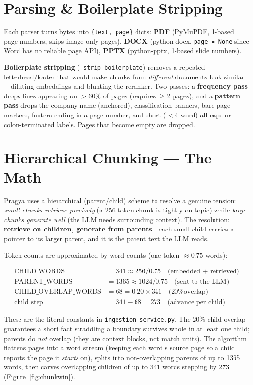 \documentclass[11pt,a4paper,oneside]{report}
\newcommand{\code}[1]{\texttt{#1}}
\begin{document}
\section{Parsing \& Boilerplate Stripping}
Each parser turns bytes into \code{\{text, page\}} dicts: \textbf{PDF} (PyMuPDF, 1-based page
numbers, skips image-only pages), \textbf{DOCX} (python-docx, \code{page = None} since Word has
no reliable page API), \textbf{PPTX} (python-pptx, 1-based slide numbers).

\textbf{Boilerplate stripping} (\code{\_strip\_boilerplate}) removes a repeated
letterhead/footer that would make chunks from \emph{different} documents look similar---diluting
embeddings and blunting the reranker. Two passes: a \textbf{frequency pass} drops lines appearing
on $>60\%$ of pages (requires $\geq 2$ pages), and a \textbf{pattern pass} drops the company name
(anchored), classification banners, bare page markers, footers ending in a page number, and short
($<4$-word) all-caps or colon-terminated labels. Pages that become empty are dropped.

\section{Hierarchical Chunking --- The Math}
\label{sec:chunk}
Pragya uses a hierarchical (parent/child) scheme to resolve a genuine tension: \emph{small chunks
retrieve precisely} (a 256-token chunk is tightly on-topic) while \emph{large chunks generate
well} (the LLM needs surrounding context). The resolution: \textbf{retrieve on children, generate
from parents}---each small child carries a pointer to its larger parent, and it is the parent text
the LLM reads.

Token counts are approximated by word counts (one token $\approx 0.75$ words):

\begin{align}
\text{CHILD\_WORDS} &= 341 \approx 256/0.75 \quad\text{(embedded + retrieved)}\\
\text{PARENT\_WORDS} &= 1365 \approx 1024/0.75 \quad\text{(sent to the LLM)}\\
\text{CHILD\_OVERLAP\_WORDS} &= 68 = 0.20 \times 341 \quad\text{(20\% overlap)}\\
\text{child\_step} &= 341 - 68 = 273 \quad\text{(advance per child)}
\end{align}

These are the literal constants in \code{ingestion\_service.py}. The 20\% child overlap guarantees
a short fact straddling a boundary survives whole in at least one child; parents do \emph{not}
overlap (they are context blocks, not match units). The algorithm flattens pages into a word
stream (keeping each word's source page so a child reports the page it \emph{starts} on), splits
into non-overlapping parents of up to 1365 words, then carves overlapping children of up to 341
words stepping by 273 (Figure~\ref{fig:chunkwin}).
\end{document}
